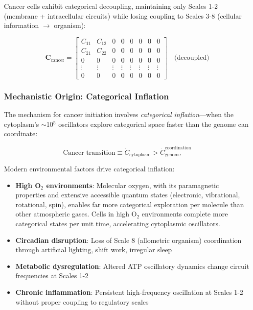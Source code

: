 \documentclass[11pt]{article}
\begin{document}
Cancer cells exhibit categorical decoupling, maintaining only Scales 1-2 (membrane + intracellular circuits) while losing coupling to Scales 3-8 (cellular information $\to$ organism):

\begin{equation}
\mathbf{C}_{\text{cancer}} = \begin{bmatrix}
C_{11} & C_{12} & 0 & 0 & 0 & 0 & 0 & 0 \\
C_{21} & C_{22} & 0 & 0 & 0 & 0 & 0 & 0 \\
0 & 0 & 0 & 0 & 0 & 0 & 0 & 0 \\
\vdots & \vdots & \vdots & \vdots & \vdots & \vdots & \vdots & \vdots \\
0 & 0 & 0 & 0 & 0 & 0 & 0 & 0
\end{bmatrix} \quad \text{(decoupled)}
\end{equation}

\subsubsection{Mechanistic Origin: Categorical Inflation}

The mechanism for cancer initiation involves \textit{categorical inflation}—when the cytoplasm's $\sim$10$^5$ oscillators explore categorical space faster than the genome can coordinate:

\begin{equation}
\text{Cancer transition} \equiv \dot{C}_{\text{cytoplasm}} > \dot{C}_{\text{genome}}^{\text{coordination}}
\end{equation}

Modern environmental factors drive categorical inflation:
\begin{itemize}
\item \textbf{High O$_2$ environments}: Molecular oxygen, with its paramagnetic properties and extensive accessible quantum states (electronic, vibrational, rotational, spin), enables far more categorical exploration per molecule than other atmospheric gases. Cells in high O$_2$ environments complete more categorical states per unit time, accelerating cytoplasmic oscillators.
\item \textbf{Circadian disruption}: Loss of Scale 8 (allometric organism) coordination through artificial lighting, shift work, irregular sleep
\item \textbf{Metabolic dysregulation}: Altered ATP oscillatory dynamics change circuit frequencies at Scales 1-2
\item \textbf{Chronic inflammation}: Persistent high-frequency oscillation at Scales 1-2 without proper coupling to regulatory scales
\end{itemize}
\end{document}
